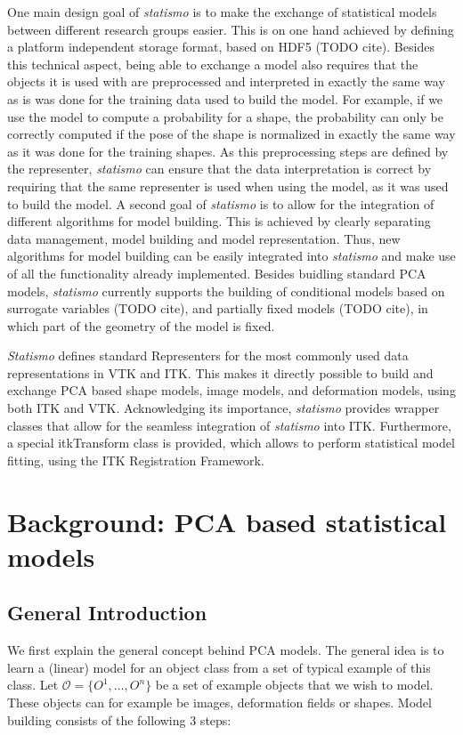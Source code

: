 \documentclass{InsightArticle}
\newcommand{\statismo}{\emph{statismo}\xspace}
\newcommand{\Statismo}{\emph{Statismo}\xspace}
\begin{document}
One main design goal of \statismo is to make the exchange of
statistical models between different research groups easier. This is
on one hand achieved by defining a platform independent storage
format, based on HDF5 (TODO cite). Besides this technical aspect,
being able to exchange a model also requires that the objects it is
used with are preprocessed and interpreted in exactly the same way as
is was done for the training data used to build the model. For
example, if we use the model to compute a probability for a shape, the
probability can only be correctly computed if the pose of the shape is
normalized in exactly the same way as it was done for the training
shapes. As this preprocessing steps are defined by the representer, \statismo can 
ensure that the data interpretation is correct by requiring that the same representer is used
when using the model, as it was used to build the model. 
A second goal of \statismo is to allow for the integration of
different algorithms for model building. This is achieved by clearly
separating data management, model building and model
representation. Thus, new algorithms for model building can be easily
integrated into \statismo and make use of all the functionality
already implemented.  Besides buidling standard PCA models, \statismo
currently supports the building of conditional models based on surrogate
variables (TODO cite), and partially fixed models (TODO cite), in
which part of the geometry of the model is fixed.


\Statismo defines standard Representers for the most commonly used
data representations in VTK and ITK. This makes it directly possible
to build and exchange PCA based shape models, image models, and
deformation models, using both ITK and VTK. Acknowledging its
importance, \statismo provides wrapper classes that allow for the
seamless integration of \statismo into ITK. Furthermore, a special
itkTransform class is provided, which allows to perform statistical
model fitting, using the ITK Registration Framework.




\section{Background: PCA based statistical models}
\subsection{General Introduction}\label{sec:pca-models}
We first explain the general concept behind PCA models. The general idea
is to learn a (linear) model for an object class from a set of typical example of this class. Let $\mathcal{O} = \{O^1, \ldots, O^n\}$ be a
set of example objects that we wish to model. These objects can for
example be images, deformation fields or shapes. Model building
consists of the following 3 steps:
\end{document}
